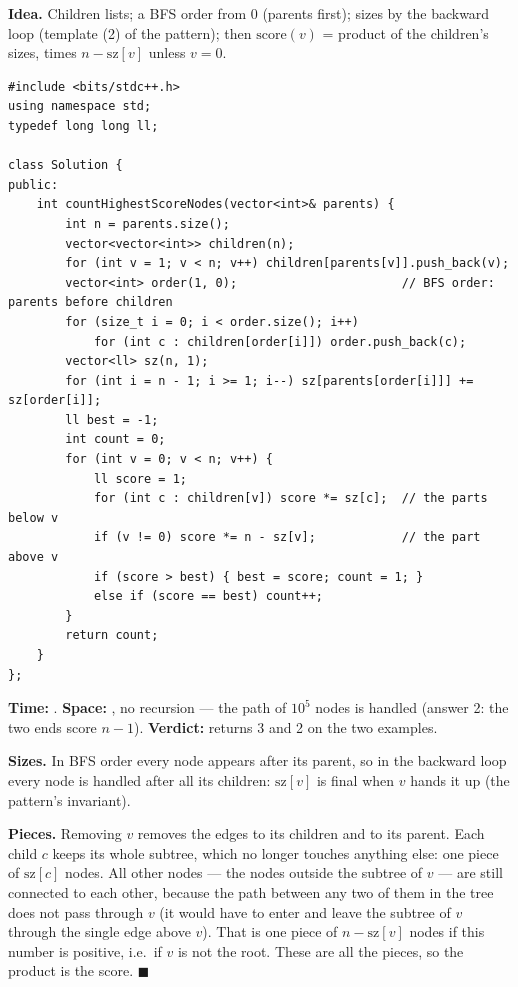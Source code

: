 \begin{algorithmbox}
\textbf{Idea.} Children lists; a BFS order from 0 (parents first); sizes by the backward loop (template (2) of the pattern); then $\mathrm{score}(v)$ = product of the children's sizes, times $n - \mathrm{sz}[v]$ unless $v = 0$.

\begin{lstlisting}[style=cpp]
#include <bits/stdc++.h>
using namespace std;
typedef long long ll;

class Solution {
public:
    int countHighestScoreNodes(vector<int>& parents) {
        int n = parents.size();
        vector<vector<int>> children(n);
        for (int v = 1; v < n; v++) children[parents[v]].push_back(v);
        vector<int> order(1, 0);                       // BFS order: parents before children
        for (size_t i = 0; i < order.size(); i++)
            for (int c : children[order[i]]) order.push_back(c);
        vector<ll> sz(n, 1);
        for (int i = n - 1; i >= 1; i--) sz[parents[order[i]]] += sz[order[i]];
        ll best = -1;
        int count = 0;
        for (int v = 0; v < n; v++) {
            ll score = 1;
            for (int c : children[v]) score *= sz[c];  // the parts below v
            if (v != 0) score *= n - sz[v];            // the part above v
            if (score > best) { best = score; count = 1; }
            else if (score == best) count++;
        }
        return count;
    }
};
\end{lstlisting}

\begin{complexitybox}
\textbf{Time:} . \textbf{Space:} , no recursion --- the path of $10^5$ nodes is handled (answer 2: the two ends score $n - 1$). \textbf{Verdict:} returns 3 and 2 on the two examples.
\end{complexitybox}
\end{algorithmbox}

\begin{invariantbox}
\textbf{Sizes.} In BFS order every node appears after its parent, so in the backward loop every node is handled after all its children: $\mathrm{sz}[v]$ is final when $v$ hands it up (the pattern's invariant).

\textbf{Pieces.} Removing $v$ removes the edges to its children and to its parent. Each child $c$ keeps its whole subtree, which no longer touches anything else: one piece of $\mathrm{sz}[c]$ nodes. All other nodes --- the nodes outside the subtree of $v$ --- are still connected to each other, because the path between any two of them in the tree does not pass through $v$ (it would have to enter and leave the subtree of $v$ through the single edge above $v$). That is one piece of $n - \mathrm{sz}[v]$ nodes if this number is positive, i.e.\ if $v$ is not the root. These are all the pieces, so the product is the score. \hfill$\blacksquare$
\end{invariantbox}

